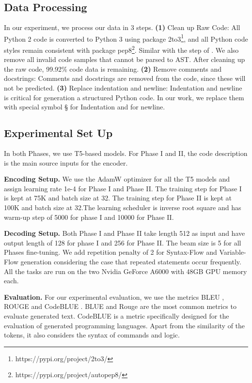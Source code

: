 \documentclass[11pt]{article}
\begin{document}
\subsection{Data Processing}
In our experiment, we process our data in 3 steps. \textbf{(1)} Clean up Raw Code: All Python 2 code is converted to Python 3 using package 2to3\footnote{https://pypi.org/project/2to3/}, and all Python code styles remain consistent with package pep8\footnote{https://pypi.org/project/autopep8/}. Similar with the step of \cite{Clement2020PyMT5MT}. We also remove all invalid code samples that cannot be parsed to AST. After cleaning up the raw code, 99.92\% code data is remaining. \textbf{(2)} Remove comments and docstrings: Comments and docstrings are removed from the code, since these will not be predicted. \textbf{(3)} Replace indentation and newline: Indentation and newline is critical for generation a structured Python code. In our work, we replace them with special symbol § for Indentation and  for newline.


\subsection{Experimental Set Up}

In both Phases, we use T5-based models. For Phase I and II, the code description is the main source inputs for the encoder. 

\textbf{Encoding Setup.} We use the AdamW optimizer for all the T5 models and assign learning rate 1e-4 for Phase I and Phase II. The training step for Phase I is kept at 75K and batch size at 32.  The training step for Phase II is kept at 100K and batch size at 32.The learning scheduler is inverse root square and has warm-up step of 5000 for phase I and 10000 for Phase II.

\textbf{Decoding Setup.} Both Phase I and Phase II take length 512 as input and have output length of 128 for phase I and 256 for Phase II. The beam size is 5 for all Phases fine-tuning.
We add repetition penalty of 2 for Syntax-Flow and Variable-Flow generation considering the case that repeated statements occur frequently.
All the tasks are run on the two Nvidia GeForce A6000 with 48GB GPU memory each. 




\textbf{Evaluation.} For our experimental evaluation, we use the metrics BLEU \citep{Papineni02bleu:a}, ROUGE \citep{Lin2004ROUGEAP} and CodeBLUE \citep{Ren2020CodeBLEUAM}. BLUE and Rouge are the most common metrics to evaluate generated text. CodeBLUE is a metric specifically designed for the evaluation of generated programming languages. Apart from the similarity of the tokens, it also considers the syntax of commands and logic.
\end{document}
